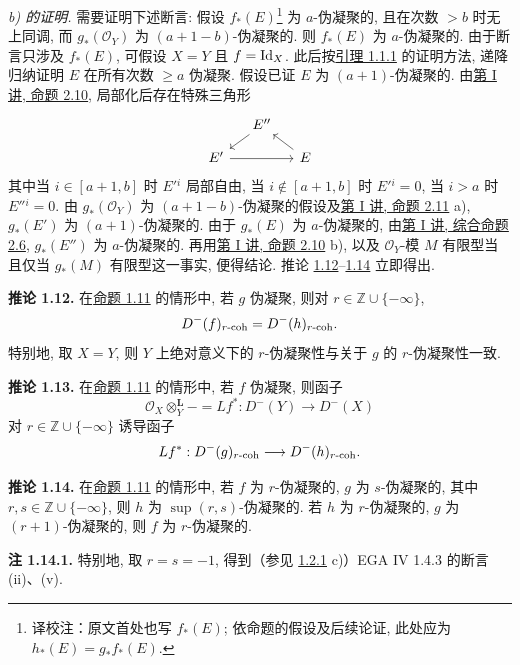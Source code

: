 \emph{b) 的证明.} 需要证明下述断言: 假设 \(f_*(E)\)\footnote{译校注：原文首处也写 $f_*(E)$; 依命题的假设及后续论证, 此处应为 $h_*(E)=g_*f_*(E)$.} 为 \(a\)-伪凝聚的, 且在次数 \(>b\) 时无上同调, 而 \(g_*(\mathcal O_Y)\) 为 \((a+1-b)\)-伪凝聚的. 则 \(f_*(E)\) 为 \(a\)-伪凝聚的. 由于断言只涉及 \(f_*(E)\), 可假设 \(X=Y\) 且 \(f=\operatorname{Id}_X\). 此后按\hyperlink{sga6.e03.lem.1-1-1}{引理 1.1.1} 的证明方法, 递降归纳证明 \(E\) 在所有次数 \(\geq a\) 伪凝聚. 假设已证 \(E\) 为 \((a+1)\)-伪凝聚的. 由\hyperlink{sga6.e01.prop.2-10}{第 I 讲, 命题 2.10}, 局部化后存在特殊三角形
\[
\begin{tikzcd}[column sep=small,row sep=small]
&E''\arrow[dl]&\\
E'\arrow[rr]&&E\arrow[ul]
\end{tikzcd}
\]
其中当 \(i\in [a+1,b]\) 时 \(E'{}^i\) 局部自由, 当 \(i\notin [a+1,b]\) 时 \(E'{}^i=0\), 当 \(i>a\) 时 \(E''{}^i=0\). 由 \(g_*(\mathcal O_Y)\) 为 \((a+1-b)\)-伪凝聚的假设及\hyperlink{sga6.e01.prop.2-11}{第 I 讲, 命题 2.11} a), \(g_*(E')\) 为 \((a+1)\)-伪凝聚的. 由于 \(g_*(E)\) 为 \(a\)-伪凝聚的, 由\hyperlink{sga6.e01.schol.2-6}{第 I 讲, 综合命题 2.6}, \(g_*(E'')\) 为 \(a\)-伪凝聚的. 再用\hyperlink{sga6.e01.prop.2-10}{第 I 讲, 命题 2.10} b), 以及 \(\mathcal O_Y\)-模 \(M\) 有限型当且仅当 \(g_*(M)\) 有限型这一事实, 便得结论. 推论 \hyperlink{sga6.e03.cor.1-12}{1.12}--\hyperlink{sga6.e03.cor.1-14}{1.14} 立即得出.

\textbf{推论 1.12.} 在\hyperlink{sga6.e03.prop.1-11}{命题 1.11} 的情形中, 若 \(g\) 伪凝聚, 则对 \(r\in\mathbb Z\cup\{-\infty\}\),
\[
  D^{-}(f)_{r\text{-}\mathrm{coh}}=D^{-}(h)_{r\text{-}\mathrm{coh}}.
\]
特别地, 取 \(X=Y\), 则 \(Y\) 上绝对意义下的 \(r\)-伪凝聚性与关于 \(g\) 的 \(r\)-伪凝聚性一致.

\textbf{推论 1.13.} 在\hyperlink{sga6.e03.prop.1-11}{命题 1.11} 的情形中, 若 \(f\) 伪凝聚, 则函子
\[
  \mathcal O_X\otimes_Y^{\mathbf L}-=Lf^*:D^{-}(Y)\longrightarrow D^{-}(X)
\]
对 \(r\in\mathbb Z\cup\{-\infty\}\) 诱导函子
\[
  Lf^*:D^{-}(g)_{r\text{-}\mathrm{coh}}\longrightarrow D^{-}(h)_{r\text{-}\mathrm{coh}}.
\]

\textbf{推论 1.14.} 在\hyperlink{sga6.e03.prop.1-11}{命题 1.11} 的情形中, 若 \(f\) 为 \(r\)-伪凝聚的, \(g\) 为 \(s\)-伪凝聚的, 其中 \(r,s\in\mathbb Z\cup\{-\infty\}\), 则 \(h\) 为 \(\sup(r,s)\)-伪凝聚的. 若 \(h\) 为 \(r\)-伪凝聚的, \(g\) 为 \((r+1)\)-伪凝聚的, 则 \(f\) 为 \(r\)-伪凝聚的.

\textbf{注 1.14.1.} 特别地, 取 \(r=s=-1\), 得到（参见 \hyperlink{sga6.e03.rem.1-2-1}{1.2.1} c)）EGA IV 1.4.3 的断言 (ii)、(v).

